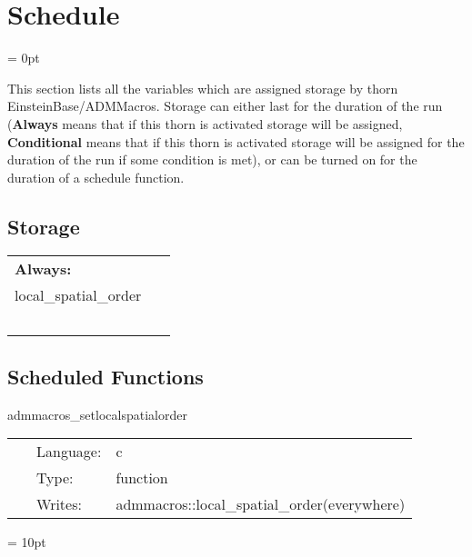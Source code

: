 
\section{Schedule} 


\parskip = 0pt


\noindent This section lists all the variables which are assigned storage by thorn EinsteinBase/ADMMacros.  Storage can either last for the duration of the run ({\bf Always} means that if this thorn is activated storage will be assigned, {\bf Conditional} means that if this thorn is activated storage will be assigned for the duration of the run if some condition is met), or can be turned on for the duration of a schedule function.


\subsection*{Storage}

\hspace{5mm}

 \begin{tabular*}{160mm}{ll} 

{\bf Always:}&  ~ \\ 
 local\_spatial\_order & ~\\ 
~ & ~\\ 
\end{tabular*} 


\subsection*{Scheduled Functions}
\vspace{5mm}


\hspace{5mm} admmacros\_setlocalspatialorder 

\hspace{5mm}{\it initialize the local\_spatial\_order } 


\hspace{5mm}

 \begin{tabular*}{160mm}{cll} 
~ & Language:  & c \\ 
~ & Type:  & function \\ 
~ & Writes:  & admmacros::local\_spatial\_order(everywhere) \\ 
\end{tabular*} 



\vspace{5mm}\parskip = 10pt 
